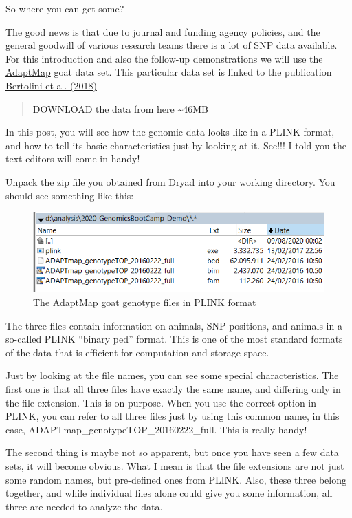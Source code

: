 \documentclass[]{book}
\begin{document}
So where you can get some?

The good news is that due to journal and funding agency policies, and
the general goodwill of various research teams there is a lot of SNP
data available. For this introduction and also the follow-up
demonstrations we will use the
\href{http://www.goatadaptmap.org/}{AdaptMap} goat data set. This
particular data set is linked to the publication
\href{https://gsejournal.biomedcentral.com/articles/10.1186/s12711-018-0421-y}{Bertolini
et al. (2018)}

\begin{quote}
\href{https://datadryad.org/stash/dataset/doi:10.5061/dryad.v8g21pt}{DOWNLOAD
the data from here \textasciitilde{}46MB}
\end{quote}

In this post, you will see how the genomic data looks like in a PLINK
format, and how to tell its basic characteristics just by looking at it.
See!!! I told you the text editors will come in handy!

Unpack the zip file you obtained from Dryad into your working directory.
You should see something like this:

\begin{figure}
\includegraphics[width=8.49in]{images/6-1-AdaptMapGenotypeFiles} \caption{The AdaptMap goat genotype files in PLINK format}\label{fig:fig6-1}
\end{figure}

The three files contain information on animals, SNP positions, and
animals in a so-called PLINK ``binary ped'' format. This is one of the
most standard formats of the data that is efficient for computation and
storage space.

Just by looking at the file names, you can see some special
characteristics. The first one is that all three files have exactly the
same name, and differing only in the file extension. This is on purpose.
When you use the correct option in PLINK, you can refer to all three
files just by using this common name, in this case,
ADAPTmap\_genotypeTOP\_20160222\_full. This is really handy!

The second thing is maybe not so apparent, but once you have seen a few
data sets, it will become obvious. What I mean is that the file
extensions are not just some random names, but pre-defined ones from
PLINK. Also, these three belong together, and while individual files
alone could give you some information, all three are needed to analyze
the data.
\end{document}
